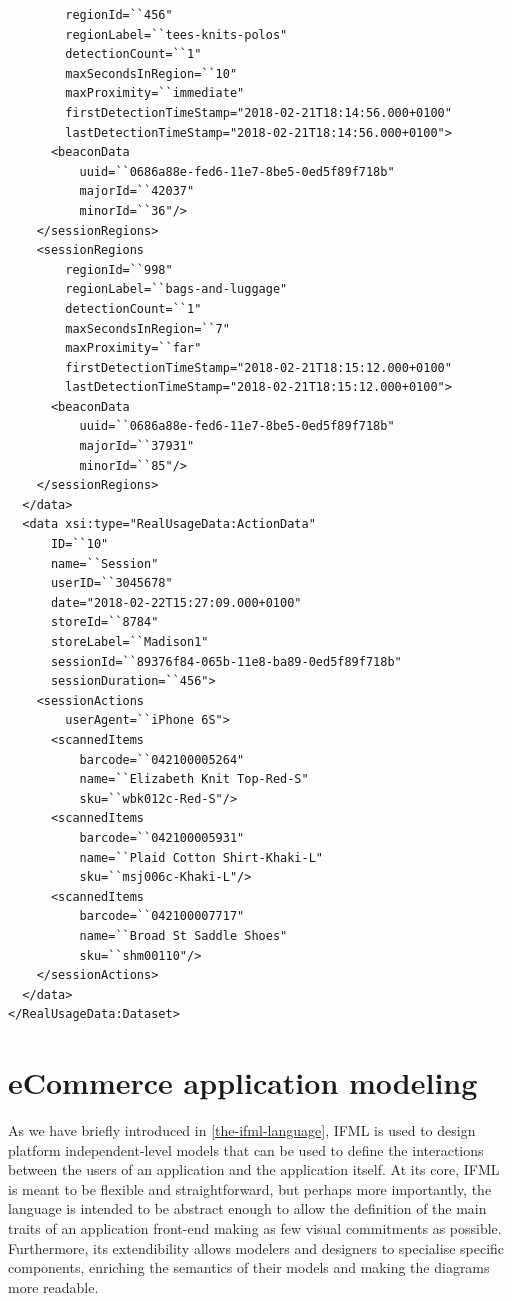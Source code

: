 \begin{lstlisting}
        regionId=``456"
        regionLabel=``tees-knits-polos"
        detectionCount=``1"
        maxSecondsInRegion=``10"
        maxProximity=``immediate"
        firstDetectionTimeStamp="2018-02-21T18:14:56.000+0100"
        lastDetectionTimeStamp="2018-02-21T18:14:56.000+0100">
      <beaconData
          uuid=``0686a88e-fed6-11e7-8be5-0ed5f89f718b"
          majorId=``42037"
          minorId=``36"/>
    </sessionRegions>
    <sessionRegions
        regionId=``998"
        regionLabel=``bags-and-luggage"
        detectionCount=``1"
        maxSecondsInRegion=``7"
        maxProximity=``far"
        firstDetectionTimeStamp="2018-02-21T18:15:12.000+0100"
        lastDetectionTimeStamp="2018-02-21T18:15:12.000+0100">
      <beaconData
          uuid=``0686a88e-fed6-11e7-8be5-0ed5f89f718b"
          majorId=``37931"
          minorId=``85"/>
    </sessionRegions>
  </data>
  <data xsi:type="RealUsageData:ActionData"
      ID=``10"
      name=``Session"
      userID=``3045678"
      date="2018-02-22T15:27:09.000+0100"
      storeId=``8784"
      storeLabel=``Madison1"
      sessionId=``89376f84-065b-11e8-ba89-0ed5f89f718b"
      sessionDuration=``456">
    <sessionActions
        userAgent=``iPhone 6S">
      <scannedItems
          barcode=``042100005264"
          name=``Elizabeth Knit Top-Red-S"
          sku=``wbk012c-Red-S"/>
      <scannedItems
          barcode=``042100005931"
          name=``Plaid Cotton Shirt-Khaki-L"
          sku=``msj006c-Khaki-L"/>
      <scannedItems
          barcode=``042100007717"
          name=``Broad St Saddle Shoes"
          sku=``shm00110"/>
    </sessionActions>
  </data>
</RealUsageData:Dataset>
\end{lstlisting}
\vspace{0.5cm}
\section{eCommerce application modeling}

As we have briefly introduced in \ref{the-ifml-language}, IFML is used to design platform independent-level models that can be used to define the interactions between the users of an application and the application itself. At its core, IFML is meant to be flexible and straightforward, but perhaps more importantly, the language is intended to be abstract enough to allow the definition of the main traits of an application front-end making as few visual commitments as possible. Furthermore, its extendibility  allows modelers and designers to specialise specific components, enriching the semantics of their models and making the diagrams more readable.

